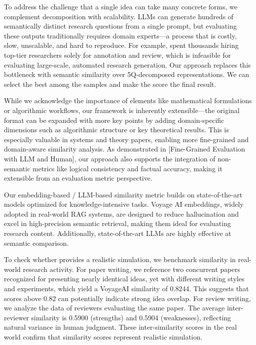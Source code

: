  To address the challenge that a single idea can take many concrete forms, we complement decomposition with scalability. LLMs can generate hundreds of semantically distinct research questions from a single prompt, but evaluating these outputs traditionally requires domain experts—a process that is costly, slow, unscalable, and hard to reproduce. For example, \citet{si2024can} spent thousands hiring top-tier researchers solely for annotation and review, which is infeasible for evaluating large-scale, automated research generation. Our approach replaces this bottleneck with semantic similarity over 5Q-decomposed representations. We can select the best among the samples and make the score the final result.

 While we acknowledge the importance of elements like mathematical formulations or algorithmic workflows, our framework is inherently extensible—the original format can be expanded with more key points by adding domain-specific dimensions such as algorithmic structure or key theoretical results. This is especially valuable in systems and theory papers, enabling more fine-grained and domain-aware similarity analysis. As demonstrated in [Fine-Grained Evaluation with LLM and Human], our approach also supports the integration of non-semantic metrics like logical consistency and factual accuracy, making it extensible from an evaluation metric perspective.

 Our embedding-based / LLM-based similarity metric builds on state-of-the-art models optimized for knowledge-intensive tasks. Voyage AI embeddings, widely adopted in real-world RAG systems, are designed to reduce hallucination and excel in high-precision semantic retrieval, making them ideal for evaluating research content. Additionally, state-of-the-art LLMs are highly effective at semantic comparison.


 To check whether \envname provides a realistic simulation, we benchmark similarity in real-world research activity. For paper writing, we reference two concurrent papers~\citep{chen2025learning,jin2025search} recognized for presenting nearly identical ideas, yet with different writing styles and experiments, which yield a VoyageAI similarity of 0.8244. This suggests that scores above 0.82 can potentially indicate strong idea overlap. For review writing, we analyze the data of reviewers evaluating the same paper. The average inter-reviewer similarity is 0.5900 (strengths) and 0.5904 (weaknesses), reflecting natural variance in human judgment. These inter-similarity scores in the real world confirm that similarity scores represent realistic simulation.

